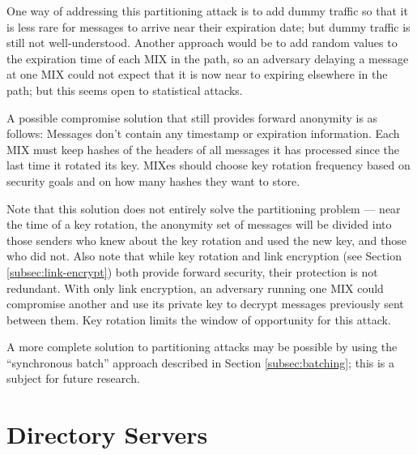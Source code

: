 \documentclass{llncs}
\begin{document}
One way of addressing this partitioning attack is to add dummy traffic
so that it is less rare for messages to arrive near their expiration date;
but dummy traffic is still not well-understood. Another approach would
be to add random values to the expiration time of each MIX in the path,
so an adversary delaying a message at one MIX could not expect that it
is now near to expiring elsewhere in the path; but this seems open to
statistical attacks.


A possible compromise solution that still provides forward anonymity
is as follows:  Messages don't
contain any timestamp or expiration information. Each MIX must keep
hashes of the headers of all messages it has processed since the last time
it rotated its key. MIXes should choose key rotation frequency based on
security goals and on how many hashes they want to store.

Note that this solution does not entirely solve the partitioning problem
--- near the time of a key rotation, the anonymity set of messages will
be divided into those senders who knew about the key rotation and used
the new key, and those who did not.
Also note that while key rotation and link encryption (see Section
\ref{subsec:link-encrypt}) both provide forward security, their protection
is not redundant. With only link encryption, an adversary running
one MIX could compromise another and use its private key to decrypt
messages previously sent between them. Key rotation limits the window
of opportunity for this attack.

A more complete solution to partitioning attacks may be possible by
using the ``synchronous batch'' approach described in
Section \ref{subsec:batching}; this is a subject for future research.


\section{Directory Servers}
\label{sec:dir-servers}
\end{document}
